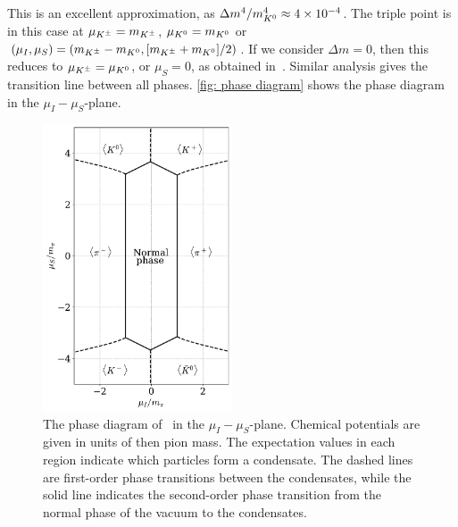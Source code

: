 %
This is an excellent approximation, as $\Delta m^4 / m_{K^0}^4 \approx 4 \times 10^{-4}$.
The triple point is in this case at $\mu_{K^\pm} = m_{K^\pm}$, $\mu_{K^0} = m_{K^0}$ or $(\mu_I, \mu_S) = (m_{K^\pm} - m_{K^0}, [m_{K^\pm}+m_{K^0}]/2)$.
If we consider $\Delta m = 0$, then this reduces to $ \mu_{K^\pm} = \mu_{K^0}$, or $\mu_S = 0$, as obtained in~\autocite{kogutQCDSmallNonzero2001}.
Similar analysis gives the transition line between all phases.
\autoref{fig: phase diagram} shows the phase diagram in the $\mu_I-\mu_S$-plane.

\begin{figure}[!htb]
    \centering
    \includegraphics[width=0.5\textwidth]{../scripts/figurer/phase_diagram.pdf}
    \caption{
        The phase diagram of \chpt\ in the $\mu_I-\mu_S$-plane.
        Chemical potentials are given in units of then pion mass.
        The expectation values in each region indicate which particles form a condensate.
        The dashed lines are first-order phase transitions between the condensates, while the solid line indicates the second-order phase transition from the normal phase of the vacuum to the condensates.
        }
    \label{fig: phase diagram}
\end{figure}

